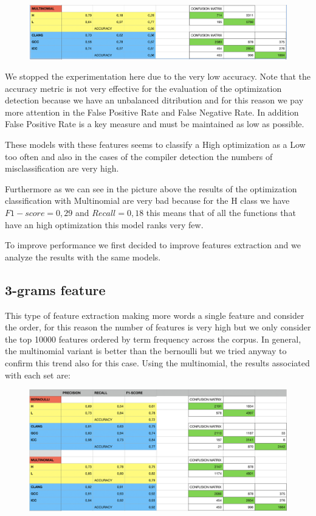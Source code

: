 \documentclass[12pt]{article}
\begin{document}
\begin{figure}[!ht]
  \includegraphics[width=1\textwidth]{pic4}
  \label{fig: Multinomial with 1-gram}
\end{figure}
\newpage

We stopped the experimentation here due to the very low accuracy. Note that the accuracy metric is not very effective for the evaluation of the optimization detection because we have an unbalanced ditribution and for this reason we pay more attention in the False Positive Rate and False Negative Rate. In addition False Positive Rate is a key measure and must be maintained as low as possible.

These models with these features seems to classify a High optimization as a Low too often and also in the cases of the compiler detection the numbers of misclassification are very high.

Furthermore as we can see in the picture above the results of the optimization classification with Multinomial are very bad because for the H class we have
$F1-score = 0,29$ and $Recall = 0,18$ this means that of all the functions that have an high optimization this model ranks very few.

To improve performance we first decided to improve features extraction and we analyze the results with the same models.

\subsection{3-grams feature}
This type of feature extraction  making more words a single feature and consider the order, for this reason the number of features is very high but we only consider the top 10000 features ordered by term frequency across the corpus.
In general, the multinomial variant is better than the bernoulli but we tried anyway to confirm this trend also for this case.
Using the multinomial, the results associated with each set are:

\begin{figure}[!ht]
  \includegraphics[width=1\textwidth]{pic5}
  \label{fig: Bernoulli and Multinomial with 3-grams}
\end{figure}
\end{document}
